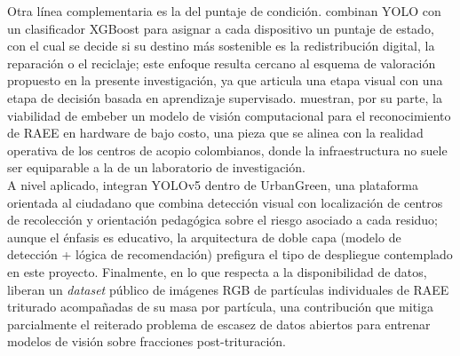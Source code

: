 Otra línea complementaria es la del puntaje de condición. \cite{menagaIntelligentDeviceCondition2026} combinan YOLO con un clasificador XGBoost para asignar a cada dispositivo un puntaje de estado, con el cual se decide si su destino más sostenible es la redistribución digital, la reparación o el reciclaje; este enfoque resulta cercano al esquema de valoración propuesto en la presente investigación, ya que articula una etapa visual con una etapa de decisión basada en aprendizaje supervisado. \cite{ilievEmbeddedSystemEwaste2023} muestran, por su parte, la viabilidad de embeber un modelo de visión computacional para el reconocimiento de RAEE en hardware de bajo costo, una pieza que se alinea con la realidad operativa de los centros de acopio colombianos, donde la infraestructura no suele ser equiparable a la de un laboratorio de investigación.\\

A nivel aplicado, \cite{madusankaUrbanGreenEWasteDetection2025a} integran YOLOv5 dentro de UrbanGreen, una plataforma orientada al ciudadano que combina detección visual con localización de centros de recolección y orientación pedagógica sobre el riesgo asociado a cada residuo; aunque el énfasis es educativo, la arquitectura de doble capa (modelo de detección + lógica de recomendación) prefigura el tipo de despliegue contemplado en este proyecto. Finalmente, en lo que respecta a la disponibilidad de datos, \cite{vogelgesangMaterialFlowComposition2026} liberan un \textit{dataset} público de imágenes RGB de partículas individuales de RAEE triturado acompañadas de su masa por partícula, una contribución que mitiga parcialmente el reiterado problema de escasez de datos abiertos para entrenar modelos de visión sobre fracciones post-trituración.

